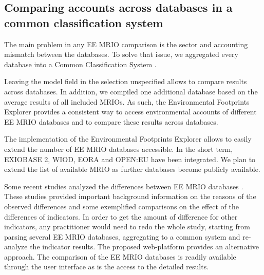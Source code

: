 \subsection{Comparing accounts across databases in a common classification system}

The main problem in any EE MRIO comparison is the sector and accounting
mismatch between the databases. To solve that issue, we aggregated every
database into a Common Classification System \cite{Steen_Olsen_2014}. 

Leaving the model field in the selection unspecified allows to compare results across databases. 
In addition, we compiled one additional database based on the average results of all included MRIOs.
As such, the Environmental Footprints Explorer provides a consistent way to access environmental accounts of different EE MRIO databases and to compare these results across databases.

The implementation of the Environmental Footprints Explorer allows to easily extend the number of EE MRIO databases accessible. In the short term, EXIOBASE 2, WIOD, EORA and OPEN:EU  have been integrated. We plan to extend the list of available MRIO as further databases become publicly available. 

Some recent studies analyzed the differences between EE MRIO databases \cite{Stadler_2014, Owen_2014, Moran_2014}. These studies provided important background information on the reasons of the observed differences and some exemplified comparisons on the effect of the differences of indicators. In order to get the amount of difference for other indicators, any practitioner would need to redo the whole study, starting from parsing several EE MRIO databases, aggregating to a common system and re-analyze the indicator results. 
The proposed web-platform provides an alternative approach. The comparison of the EE MRIO databases is readily available through the user interface as is the access to the detailed results.
